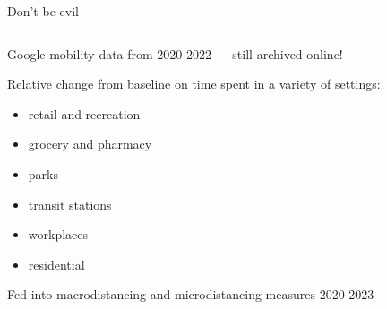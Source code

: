 \documentclass[
  ignorenonframetext,
]{beamer}
\providecommand{\tightlist}{%
  \setlength{\itemsep}{0pt}\setlength{\parskip}{0pt}}\usepackage{longtable,booktabs,array}
\begin{document}
\begin{frame}{Don't be evil}
\label{dont-be-evil-1}
\begin{columns}[T]
\begin{column}{0.6\textwidth}
Google mobility data from 2020-2022 --- still archived online!\newline

Relative change from baseline on time spent in a variety of
settings:\newline

\begin{itemize}
\tightlist
\item
  retail and recreation
\item
  grocery and pharmacy
\item
  parks
\item
  transit stations
\item
  workplaces
\item
  residential\newline
\end{itemize}

Fed into macrodistancing and microdistancing measures 2020-2023
\end{column}


\end{columns}
\end{frame}
\end{document}
